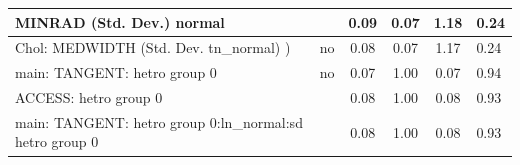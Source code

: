 \begin{table}
\begin{center}
\begin{tabular}{|l|l|c|c|c|l|}
			\hline
			MINRAD (Std. Dev.) normal &  & 0.09 & 0.07 & 1.18 & 0.24 \\
			\hline
			 Chol: MEDWIDTH (Std. Dev. tn_normal) ) & no & 0.08 & 0.07 & 1.17 & 0.24 \\
			\hline
			main: TANGENT: hetro group 0 & no & 0.07 & 1.00 & 0.07 & 0.94 \\
			\hline
			ACCESS: hetro group 0 &  & 0.08 & 1.00 & 0.08 & 0.93 \\
			\hline
			main: TANGENT: hetro group 0:ln_normal:sd  hetro group 0 &  & 0.08 & 1.00 & 0.08 & 0.93 \\
			\hline
		\end{tabular}
	\end{center}
\end{table}